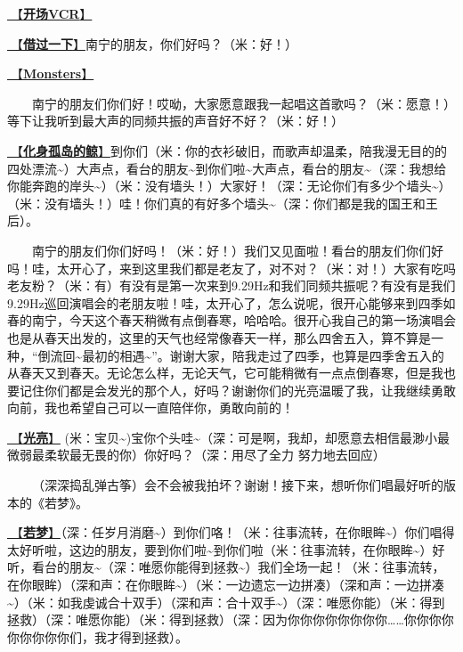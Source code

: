\documentclass[]{ctexbook}
\begin{document}
\hyperref[opening-vcr]{🎥【\textbf{开场VCR}】}

\hyperref[I-will-go-my-way]{🎵【\textbf{借过一下}】}南宁的朋友，你们好吗？（米：好！）

\hyperref[Monsters]{🎵【\textbf{Monsters}】}

  南宁的朋友们你们好！哎呦，大家愿意跟我一起唱这首歌吗？（米：愿意！）等下让我听到最大声的同频共振的声音好不好？（米：好！）

\hyperref[hua-shen-gu-dao-de-jing]{🎵【\textbf{化身孤岛的鲸}】}到你们（米：你的衣衫破旧，而歌声却温柔，陪我漫无目的的四处漂流\textasciitilde）大声点，看台的朋友\textasciitilde 到你们啦\textasciitilde 大声点，看台的朋友\textasciitilde（深：我想给你能奔跑的岸头\textasciitilde）（米：没有墙头！）大家好！（深：无论你们有多少个墙头\textasciitilde）（米：没有墙头！）哇！你们真的有好多个墙头\textasciitilde（深：你们都是我的国王和王后）。

  南宁的朋友们你们好吗！（米：好！）我们又见面啦！看台的朋友们你们好吗！哇，太开心了，来到这里我们都是老友了，对不对？（米：对！）大家有吃吗老友粉？（米：有）有没有是第一次来到9.29Hz和我们同频共振呢？有没有是我们9.29Hz巡回演唱会的老朋友啦！哇，太开心了，怎么说呢，很开心能够来到四季如春的南宁，今天这个春天稍微有点倒春寒，哈哈哈。很开心我自己的第一场演唱会也是从春天出发的，这里的天气也经常像春天一样，那么四舍五入，算不算是一种，``倒流回\textasciitilde 最初的相遇\textasciitilde{}''。谢谢大家，陪我走过了四季，也算是四季舍五入的从春天又到春天。无论怎么样，无论天气，它可能稍微有一点点倒春寒，但是我也要记住你们都是会发光的那个人，好吗？谢谢你们的光亮温暖了我，让我继续勇敢向前，我也希望自己可以一直陪伴你，勇敢向前的！

\hyperref[silver-linings]{🎵【\textbf{光亮}】} (米：宝贝\textasciitilde)宝你个头哇\textasciitilde（深：可是啊，我却，却愿意去相信最渺小最微弱最柔软最无畏的你）你好吗？（深：用尽了全力 努力地去回应）

  （深深捣乱弹古筝）会不会被我拍坏？谢谢！接下来，想听你们唱最好听的版本的《若梦》。

\hyperref[ruomeng]{🎵【\textbf{若梦}】}（深：任岁月消磨\textasciitilde）到你们咯！（米：往事流转，在你眼眸\textasciitilde）你们唱得太好听啦，这边的朋友，要到你们啦\textasciitilde 到你们啦（米：往事流转，在你眼眸\textasciitilde）好听，看台的朋友\textasciitilde（深：唯愿你能得到拯救\textasciitilde）我们全场一起！（米：往事流转，在你眼眸）（深和声：在你眼眸\textasciitilde）（米：一边遗忘一边拼凑）（深和声：一边拼凑\textasciitilde）（米：如我虔诚合十双手）（深和声：合十双手\textasciitilde）（深：唯愿你能）（米：得到拯救）（深：唯愿你能）（米：得到拯救）（深：因为你你你你你你你你\ldots\ldots 你你你你你你你你你们，我才得到拯救）。
\end{document}
